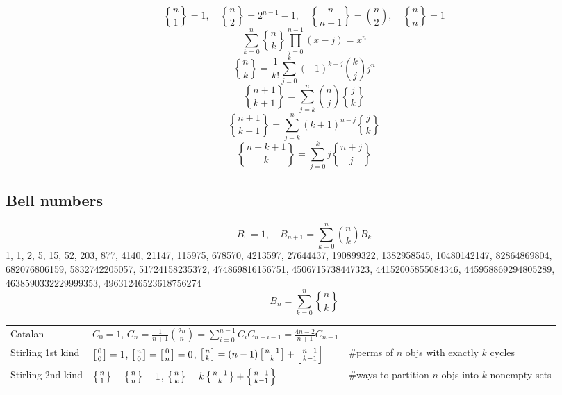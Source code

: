 \documentclass[11.5pt,a4paper,landscape,oneside]{amsart}
\newcommand{\Sequence}[1]{\subsection{#1}}
\newcommand{\stirlingii}{\genfrac{\{}{\}}{0pt}{}}
\begin{document}
\begin{multicols*}{2}
\begin{equation}
	\end{equation}
	\begin{equation}
		\stirlingii{n}{1} = 1,\quad\stirlingii{n}{2} = 2^{n-1}-1,\quad\stirlingii{n}{n-1}=\binom{n}{2},\quad\stirlingii{n}{n}=1
	\end{equation}
	\begin{equation}
		\sum_{k=0}^n \stirlingii{n}{k}\prod_{j=0}^{n-1}(x-j)=x^n
	\end{equation}
	\begin{equation}
		\stirlingii{n}{k}=\frac{1}{k!}\sum_{j=0}^k (-1)^{k-j}\binom{k}{j}j^n
	\end{equation}
	\begin{equation}
		\stirlingii{n+1}{k+1} = \sum_{j=k}^n \binom{n}{j} \stirlingii{j}{k}
	\end{equation}
	\begin{equation}
		\stirlingii{n+1}{k+1} = \sum_{j=k}^n (k+1)^{n-j} \stirlingii{j}{k}
	\end{equation}
	\begin{equation}
		\stirlingii{n+k+1}{k} = \sum_{j=0}^k j \stirlingii{n+j}{j}
	\end{equation}
	\Sequence{Bell numbers}
	\begin{equation}
		B_0=1,\quad B_{n+1}=\sum_{k=0}^{n} \binom{n}{k} B_k
	\end{equation}
	1, 1, 2, 5, 15, 52, 203, 877, 4140, 21147, 115975, 678570, 4213597, 27644437, 190899322, 1382958545, 10480142147, 82864869804, 682076806159,  5832742205057, 51724158235372, 474869816156751, 4506715738447323, 44152005855084346, 445958869294805289, 4638590332229999353, 49631246523618756274
	\begin{equation}
		B_n=\sum_{k=0}^n \stirlingii{n}{k}
	\end{equation}
		\clearpage
		\begin{tabular}{@{}l|l|l@{}}
    \toprule
    Catalan	&	$C_0=1$, $C_n=\frac{1}{n+1}\binom{2n}{n} = \sum_{i=0}^{n-1}C_iC_{n-i-1} = \frac{4n-2}{n+1}C_{n-1}$  & \\
    Stirling 1st kind & $\left[{0\atop 0}\right]=1$, $\left[{n\atop 0}\right]=\left[{0\atop n}\right]=0$, $\left[{n\atop k}\right]=(n-1)\left[{n-1\atop k}\right]+\left[{n-1\atop k-1}\right]$ & \#perms of $n$ objs with exactly $k$ cycles\\
    Stirling 2nd kind & $\left\{{n\atop 1}\right\}=\left\{{n\atop n}\right\}=1$, $\left\{{n\atop k}\right\} = k \left\{{ n-1 \atop k }\right\} + \left\{{n-1\atop k-1}\right\}$ & \#ways to partition $n$ objs into $k$ nonempty sets\\

\end{tabular}
\end{multicols*}
\end{document}

